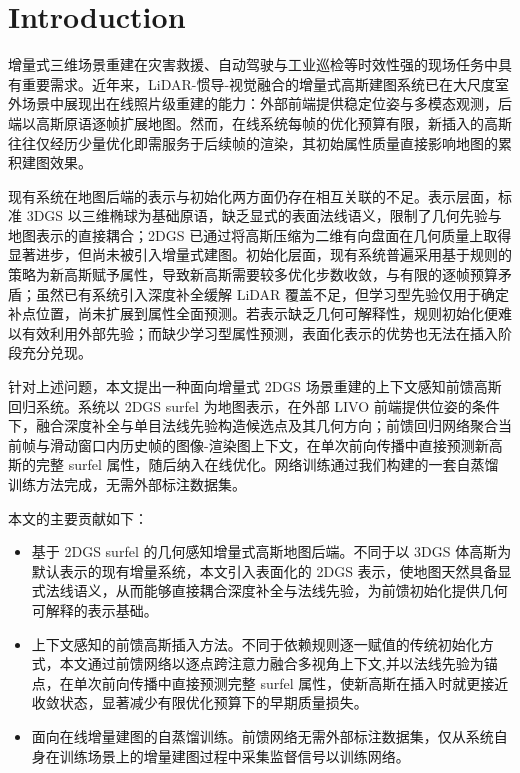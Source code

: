 
\section{Introduction}

增量式三维场景重建在灾害救援、自动驾驶与工业巡检等时效性强的现场任务中具有重要需求。近年来，LiDAR-惯导-视觉融合的增量式高斯建图系统已在大尺度室外场景中展现出在线照片级重建的能力：外部前端提供稳定位姿与多模态观测，后端以高斯原语逐帧扩展地图。然而，在线系统每帧的优化预算有限，新插入的高斯往往仅经历少量优化即需服务于后续帧的渲染，其初始属性质量直接影响地图的累积建图效果。

现有系统在地图后端的表示与初始化两方面仍存在相互关联的不足。表示层面，标准 3DGS 以三维椭球为基础原语，缺乏显式的表面法线语义，限制了几何先验与地图表示的直接耦合；2DGS 已通过将高斯压缩为二维有向盘面在几何质量上取得显著进步，但尚未被引入增量式建图。初始化层面，现有系统普遍采用基于规则的策略为新高斯赋予属性，导致新高斯需要较多优化步数收敛，与有限的逐帧预算矛盾；虽然已有系统引入深度补全缓解 LiDAR 覆盖不足，但学习型先验仅用于确定补点位置，尚未扩展到属性全面预测。若表示缺乏几何可解释性，规则初始化便难以有效利用外部先验；而缺少学习型属性预测，表面化表示的优势也无法在插入阶段充分兑现。

针对上述问题，本文提出一种面向增量式 2DGS 场景重建的上下文感知前馈高斯回归系统。系统以 2DGS surfel 为地图表示，在外部 LIVO 前端提供位姿的条件下，融合深度补全与单目法线先验构造候选点及其几何方向；前馈回归网络聚合当前帧与滑动窗口内历史帧的图像-渲染图上下文，在单次前向传播中直接预测新高斯的完整 surfel 属性，随后纳入在线优化。网络训练通过我们构建的一套自蒸馏训练方法完成，无需外部标注数据集。

本文的主要贡献如下：

\begin{itemize}
    \item 基于 2DGS surfel 的几何感知增量式高斯地图后端。不同于以 3DGS 体高斯为默认表示的现有增量系统，本文引入表面化的 2DGS 表示，使地图天然具备显式法线语义，从而能够直接耦合深度补全与法线先验，为前馈初始化提供几何可解释的表示基础。

    \item 上下文感知的前馈高斯插入方法。不同于依赖规则逐一赋值的传统初始化方式，本文通过前馈网络以逐点跨注意力融合多视角上下文,并以法线先验为锚点，在单次前向传播中直接预测完整 surfel 属性，使新高斯在插入时就更接近收敛状态，显著减少有限优化预算下的早期质量损失。

    \item 面向在线增量建图的自蒸馏训练。前馈网络无需外部标注数据集，仅从系统自身在训练场景上的增量建图过程中采集监督信号以训练网络。
\end{itemize}
